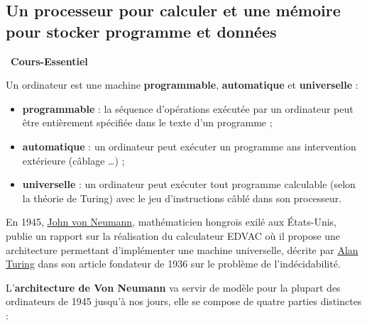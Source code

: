 \documentclass[a4paper, french, 11pt]{article}  %
\newcounter{prop}
\newcounter{cours}
\newenvironment{cours}[1]
{\par \medskip   \addtocounter{cours}{1} \noindent  
\begin{bclogo}[arrondi =0.1,  ombre = true, barre=none, logo=\bcbook, marge=4]{~\textbf{Cours-Essentiel} \textbf{\thecours} {\itshape #1} }  \par}
{
\end{bclogo}
 \par \bigskip }
\newcounter{prog}
\begin{document}
\subsection{Un processeur pour calculer et une mémoire pour stocker programme et données}


\begin{cours}{}

Un ordinateur est une machine \textbf{programmable}, \textbf{automatique} et \textbf{universelle} :

\begin{itemize}
	
	\item \textbf{programmable} : la séquence d'opérations exécutée par un ordinateur peut être entièrement spécifiée dans le texte d'un programme ;
	\item \textbf{automatique} : un ordinateur peut exécuter un programme ans intervention extérieure (câblage \ldots) ;
	\item \textbf{universelle} : un ordinateur peut exécuter tout programme calculable (selon la théorie de Turing) avec le jeu d'instructions câblé dans son processeur.	

\end{itemize}

En 1945,  \href{https://fr.wikipedia.org/wiki/John_von_Neumann}{John von Neumann}, mathématicien hongrois exilé aux États-Unis, publie un rapport sur la réalisation du calculateur EDVAC où il propose une architecture permettant d'implémenter une machine universelle, décrite par \href{https://interstices.info/alan-turing-itineraire-dun-precurseur/}{Alan Turing} dans son article fondateur de 1936 sur le problème de l'indécidabilité. 

L'\textbf{architecture de Von Neumann }va servir de modèle pour la plupart des ordinateurs de 1945 jusqu'à nos jours, elle se compose de quatre parties distinctes :

\begin{itemize}[label=]


\end{itemize}
\end{cours}
\end{document}
